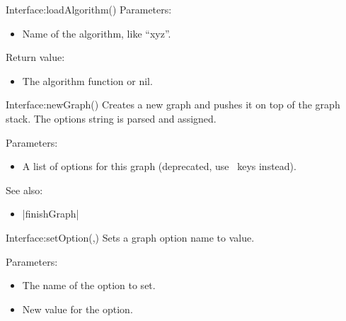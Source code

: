 \begin{luacommand}{{Interface:loadAlgorithm}()}
Parameters:
\begin{itemize}
	\item[]  \subitem Name of  the algorithm, like ``xyz''.
\end{itemize}


Return value:
\begin{itemize} \item[] The algorithm function or nil. \end{itemize}


\end{luacommand}\begin{luacommand}{{Interface:newGraph}()}
Creates a new graph and pushes it on top of the graph stack.  The options string is parsed and assigned.

Parameters:
\begin{itemize}
	\item[]  \subitem A list of options for this graph (deprecated, use \tikzname\ keys instead).
\end{itemize}



See also:
\begin{itemize}
	\item[] |finishGraph|
\end{itemize}

\end{luacommand}\begin{luacommand}{{Interface:setOption}(,)}
Sets a graph option name to value.

Parameters:
\begin{itemize}
	\item[]  \subitem The name of the option to set.\item[]  \subitem New value for the option.
\end{itemize}



\end{luacommand}
